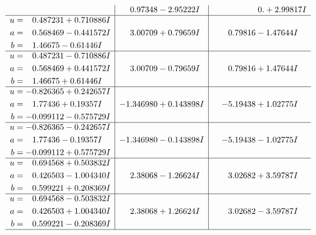 \documentclass[1p]{elsarticle_modified}
\theoremstyle{definition}
\begin{document}
$$\begin{array}{c|c|c}
 & \phantom{-}0.97348 - 2.95222 I & \phantom{-0.000000 -}0. + 2.99817 I \\ \hline\begin{aligned}
u &= \phantom{-}0.487231 + 0.710886 I \\
a &= \phantom{-}0.568469 - 0.441572 I \\
b &= \phantom{-}1.46675 - 0.61446 I\end{aligned}
 & \phantom{-}3.00709 + 0.79659 I & \phantom{-}0.79816 - 1.47644 I \\ \hline\begin{aligned}
u &= \phantom{-}0.487231 - 0.710886 I \\
a &= \phantom{-}0.568469 + 0.441572 I \\
b &= \phantom{-}1.46675 + 0.61446 I\end{aligned}
 & \phantom{-}3.00709 - 0.79659 I & \phantom{-}0.79816 + 1.47644 I \\ \hline\begin{aligned}
u &= -0.826365 + 0.242657 I \\
a &= \phantom{-}1.77436 + 0.19357 I \\
b &= -0.099112 - 0.575729 I\end{aligned}
 & -1.346980 + 0.143898 I & -5.19438 + 1.02775 I \\ \hline\begin{aligned}
u &= -0.826365 - 0.242657 I \\
a &= \phantom{-}1.77436 - 0.19357 I \\
b &= -0.099112 + 0.575729 I\end{aligned}
 & -1.346980 - 0.143898 I & -5.19438 - 1.02775 I \\ \hline\begin{aligned}
u &= \phantom{-}0.694568 + 0.503832 I \\
a &= \phantom{-}0.426503 - 1.004340 I \\
b &= \phantom{-}0.599221 + 0.208369 I\end{aligned}
 & \phantom{-}2.38068 - 1.26624 I & \phantom{-}3.02682 + 3.59787 I \\ \hline\begin{aligned}
u &= \phantom{-}0.694568 - 0.503832 I \\
a &= \phantom{-}0.426503 + 1.004340 I \\
b &= \phantom{-}0.599221 - 0.208369 I\end{aligned}
 & \phantom{-}2.38068 + 1.26624 I & \phantom{-}3.02682 - 3.59787 I\\
 \hline 
 \end{array}$$\newpage$$\begin{array}{c|c|c}  

\end{array}$$
\end{document}
